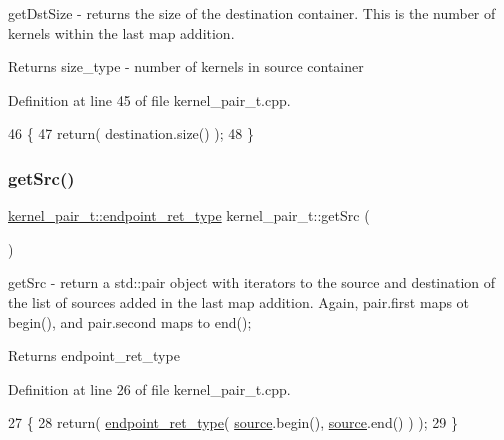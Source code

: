 get\+Dst\+Size -\/ returns the size of the destination container. This is the number of kernels within the last map addition. \begin{DoxyReturn}{Returns}
size\+\_\+type -\/ number of kernels in source container 
\end{DoxyReturn}


Definition at line 45 of file kernel\+\_\+pair\+\_\+t.\+cpp.


\begin{DoxyCode}
46 \{
47     \textcolor{keywordflow}{return}( destination.size() );
48 \}
\end{DoxyCode}
\hypertarget{classkernel__pair__t_a855bdc92268a7836b518a91e05de1f34}{}\label{classkernel__pair__t_a855bdc92268a7836b518a91e05de1f34} 
\subsubsection{\texorpdfstring{get\+Src()}{getSrc()}}
{\footnotesize\ttfamily \hyperlink{classkernel__pair__t_abc3c7ff96f4f00f4e31c56fb2b7da728}{kernel\+\_\+pair\+\_\+t\+::endpoint\+\_\+ret\+\_\+type} kernel\+\_\+pair\+\_\+t\+::get\+Src (\begin{DoxyParamCaption}{ }\end{DoxyParamCaption})}

get\+Src -\/ return a std\+::pair object with iterators to the source and destination of the list of sources added in the last map addition. Again, pair.\+first maps ot begin(), and pair.\+second maps to end(); \begin{DoxyReturn}{Returns}
endpoint\+\_\+ret\+\_\+type 
\end{DoxyReturn}


Definition at line 26 of file kernel\+\_\+pair\+\_\+t.\+cpp.


\begin{DoxyCode}
27 \{
28     \textcolor{keywordflow}{return}( \hyperlink{classkernel__pair__t_abc3c7ff96f4f00f4e31c56fb2b7da728}{endpoint\_ret\_type}( \hyperlink{classsource}{source}.begin(), \hyperlink{classsource}{source}.end() ) );
29 \}
\end{DoxyCode}
\hypertarget{classkernel__pair__t_a08c5358da2a54295a981f888770baddf}{}\label{classkernel__pair__t_a08c5358da2a54295a981f888770baddf} 
